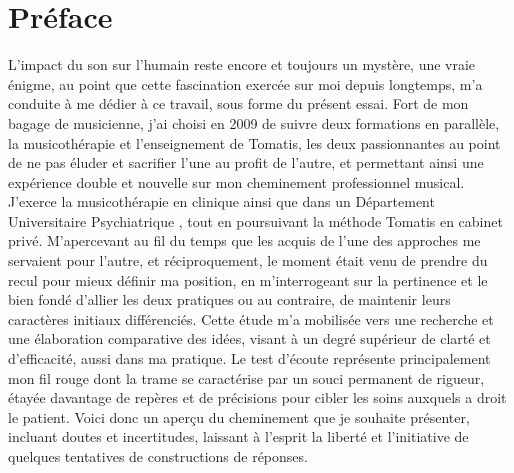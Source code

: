 \chapter*{Préface}
 L'impact du son sur l'humain reste encore et toujours un mystère, une vraie énigme, au point que cette  
 fascination exercée  sur moi depuis longtemps, m'a conduite à me dédier à ce travail, sous forme du 
 présent essai.
 Fort de mon bagage de musicienne, j'ai choisi en 2009  de suivre deux formations en parallèle,  
 la musicothérapie et l'enseignement de  Tomatis, les deux passionnantes au point de ne pas éluder et 
 sacrifier l'une au profit de l'autre, et permettant ainsi une expérience double et nouvelle sur mon 
 cheminement professionnel musical.
 J'exerce  la musicothérapie en clinique ainsi que dans un 
 Département 
 Universitaire Psychiatrique , tout en poursuivant  la méthode 
 Tomatis en cabinet privé. M'apercevant au fil du temps que les 
 acquis de l'une des approches me servaient  pour l'autre, et réciproquement, le moment était venu de 
 prendre du recul pour mieux 
 définir ma position, en  m'interrogeant  sur la pertinence et le bien fondé d'allier les deux pratiques 
 ou au contraire, de maintenir  leurs caractères initiaux différenciés.  Cette étude m'a mobilisée vers une 
 recherche et une élaboration comparative  des idées, visant à un degré supérieur de clarté et d'efficacité, 
 aussi dans ma pratique.
 Le test d'écoute représente principalement mon fil rouge dont la trame se caractérise par un souci 
 permanent de rigueur, étayée davantage de repères et de précisions  pour cibler les 
 soins auxquels a droit le patient.
 Voici donc un aperçu du cheminement que je souhaite présenter, incluant doutes et incertitudes,
  laissant à l'esprit la liberté et l'initiative de quelques tentatives de constructions de réponses.

